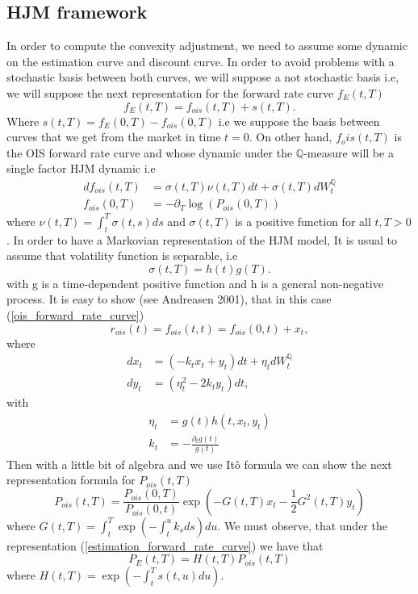 \documentclass[a4paper,10pt]{article}
\newcommand{\1}{\mathbf{1}}
\begin{document}
\subsection{HJM framework}
In order to compute the convexity adjustment, we need to assume some dynamic on the estimation curve and discount curve. In order to avoid problems with a stochastic basis between both curves, we will suppose a not stochastic basis i.e, we will suppose the next representation for the forward rate curve $f_{E}(t, T)$
\begin{equation}\label{estimation_forward_rate_curve}
f_{E}(t,T) = f_{ois}(t,T) + s(t,T).
\end{equation}
Where $s(t,T)= f_{E}(0,T) - f_{ois}(0,T)$ i.e we suppose the basis between curves that we get from the market in time $t=0$. On other hand, $f_ois(t, T)$ is the OIS forward rate curve and whose dynamic under the $\mathbb{Q}$-measure will be a single factor HJM dynamic i.e
\begin{align}\label{ois_forward_rate_curve}
df_{ois}(t,T) &= \sigma(t,T)\nu(t,T)dt + \sigma(t,T)dW^{\mathbb{Q}}_t  \\
f_{ois}(0,T) &= -\partial_T \log\left(P_{ois}(0,T)\right) \nonumber
\end{align}
where $\nu(t,T)=\int_{t}^{T}\sigma(t,s)ds$ and $\sigma(t, T)$ is a positive function for all $t,T > 0$ . In order to have a Markovian representation of the HJM model, It is usual to assume that volatility function is separable, i.e
\begin{equation}
\sigma(t,T)= h(t)g(T).
\end{equation}
with g is a time-dependent positive function and h is a general non-negative process. It is easy to show (see Andreasen 2001), that in this case (\ref{ois_forward_rate_curve})
\begin{equation}
r_{ois}(t)=f_{ois}(t,t)= f_{ois}(0,t) + x_t,
\end{equation}  
where
\begin{align}\label{short_rate_cheyette}
dx_t &= (-k_t x_t + y_t)dt + \eta_t dW_t^{\mathbb{Q}} \nonumber \\
dy_t &= (\eta^{2}_t - 2 k_t y_t) dt ,
\end{align} 
with 
\begin{align*}
\eta_t &= g(t)h(t,x_t,y_t)  \nonumber \\
k_t &= - \frac{\partial_t g(t)}{g(t)}
\end{align*}
Then with a little bit of algebra and we use Itô formula we can show the next representation formula for $P_{ois}(t,T)$
\begin{equation}\label{bond_ois}
P_{ois}(t,T) = \frac{P_{ois}(0,T)}{P_{ois}(0,t)} \exp\left(-G(t,T)x_t - \frac{1}{2} G^{2}(t,T)y_t \right)
\end{equation}
where $G(t,T) = \int_{t}^{T} \exp\left(-\int_{t}^{u} k_s ds \right) du$. We must observe, that under the representation (\ref{estimation_forward_rate_curve}) we have that
\begin{equation}\label{bond_forward}
P_{E}(t,T)=H(t,T)P_{ois}(t,T)
\end{equation}
where $H(t,T)=\exp\left(-\int_{t}^{T}s(t,u) du \right)$.
\end{document}
